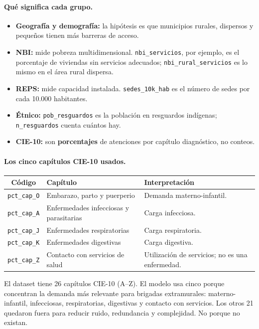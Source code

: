 \documentclass[11pt,a4paper]{article}
\newcommand{\code}[1]{\texttt{#1}}
\begin{document}
\paragraph{Qué significa cada grupo.}
\begin{itemize}[leftmargin=*]
  \item \textbf{Geografía y demografía:} la hipótesis es que municipios rurales, dispersos y pequeños tienen más barreras de acceso.
  \item \textbf{NBI:} mide pobreza multidimensional. \code{nbi_servicios}, por ejemplo, es el porcentaje de viviendas sin servicios adecuados; \code{nbi_rural_servicios} es lo mismo en el área rural dispersa.
  \item \textbf{REPS:} mide capacidad instalada. \code{sedes_10k_hab} es el número de sedes por cada 10.000 habitantes.
  \item \textbf{Étnico:} \code{pob_resguardos} es la población en resguardos indígenas; \code{n_resguardos} cuenta cuántos hay.
  \item \textbf{CIE-10:} son \textbf{porcentajes} de atenciones por capítulo diagnóstico, no conteos.
\end{itemize}

\paragraph{Los cinco capítulos CIE-10 usados.}

\begin{table}[H]
\centering
\small
\begin{tabularx}{\textwidth}{@{}c L{5.0cm} Y@{}}
\toprule
\textbf{Código} & \textbf{Capítulo} & \textbf{Interpretación} \\
\midrule
\code{pct_cap_O} & Embarazo, parto y puerperio & Demanda materno-infantil. \\
\code{pct_cap_A} & Enfermedades infecciosas y parasitarias & Carga infecciosa. \\
\code{pct_cap_J} & Enfermedades respiratorias & Carga respiratoria. \\
\code{pct_cap_K} & Enfermedades digestivas & Carga digestiva. \\
\code{pct_cap_Z} & Contacto con servicios de salud & Utilización de servicios; no es una enfermedad. \\
\bottomrule
\end{tabularx}
\end{table}

El dataset tiene 26 capítulos CIE-10 (A--Z). El modelo usa cinco porque concentran la demanda más relevante para brigadas extramurales: materno-infantil, infecciosas, respiratorias, digestivas y contacto con servicios. Los otros 21 quedaron fuera para reducir ruido, redundancia y complejidad. No porque no existan.
\end{document}
